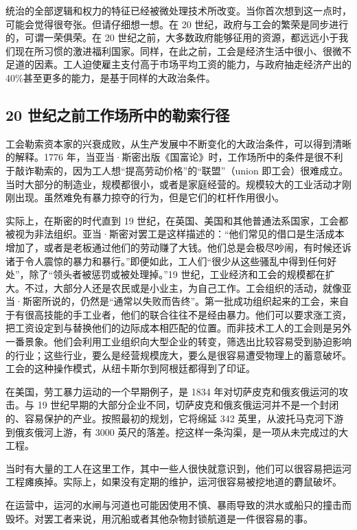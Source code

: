 统治的全部逻辑和权力的特征已经被微处理技术所改变。当你首次想到这一点时，可能会觉得很夸张。但请仔细想一想。在 20 世纪，政府与工会的繁荣是同步进行的，可谓一荣俱荣。在 20 世纪之前，大多数政府能够征用的资源，都远远小于我们现在所习惯的激进福利国家。同样，在此之前，工会是经济生活中很小、很微不足道的因素。工人迫使雇主支付高于市场平均工资的能力，与政府抽走经济产出的 40\%甚至更多的能力，是基于同样的大政治条件。

\subsection{20 世纪之前工作场所中的勒索行径}
工会勒索资本家的兴衰成败，从生产发展中不断变化的大政治条件，可以得到清晰的解释。1776 年，当亚当·斯密出版《国富论》时，工作场所中的条件是很不利于敲诈勒索的，因为工人想“提高劳动价格”的“联盟”（union 即工会）很难成立。当时大部分的制造业，规模都很小，或者是家庭经营的。规模较大的工业活动才刚刚出现。虽然难免有暴力掠夺的行为，但是它们的杠杆作用很小。

实际上，在斯密的时代直到 19 世纪，在英国、美国和其他普通法系国家，工会都被视为非法组织。亚当·斯密对罢工是这样描述的：“他们常见的借口是生活成本增加了，或者是老板通过他们的劳动赚了大钱。他们总是会极尽吵闹，有时候还诉诸于令人震惊的暴力和暴行。”即便如此，工人们“很少从这些骚乱中得到任何好处”，除了“领头者被惩罚或被处理掉。”19 世纪，工业经济和工会的规模都在扩大。不过，大部分人还是农民或是小业主，为自己工作。工会组织的活动，就像亚当·斯密所说的，仍然是“通常以失败而告终”。第一批成功组织起来的工会，来自于有很高技能的手工业者，他们的联合往往不是经由暴力。他们可以要求涨工资，把工资设定到与替换他们的边际成本相匹配的位置。而非技术工人的工会则是另外一番景象。他们会利用工业组织向大型企业的转变，筛选出比较容易受到胁迫影响的行业；这些行业，要么是经营规模庞大，要么是很容易遭受物理上的蓄意破坏。工会的这种操作模式，从纽卡斯尔到阿根廷都得到了印证。

在美国，劳工暴力运动的一个早期例子，是 1834 年对切萨皮克和俄亥俄运河的攻击。与 19 世纪早期的大部分企业不同，切萨皮克和俄亥俄运河并不是一个封闭的、容易保护的产业。按照最初的规划，它将绵延 342 英里，从波托马克河下游到俄亥俄河上游，有 3000 英尺的落差。挖这样一条沟渠，是一项从未完成过的大工程。

当时有大量的工人在这里工作，其中一些人很快就意识到，他们可以很容易把运河工程瘫痪掉。实际上，如果没有定期的维护，运河很容易被挖地道的麝鼠破坏。

在运营中，运河的水闸与河道也可能因使用不慎、暴雨导致的洪水或船只的撞击而毁坏。对罢工者来说，用沉船或者其他杂物封锁航道是一件很容易的事。

